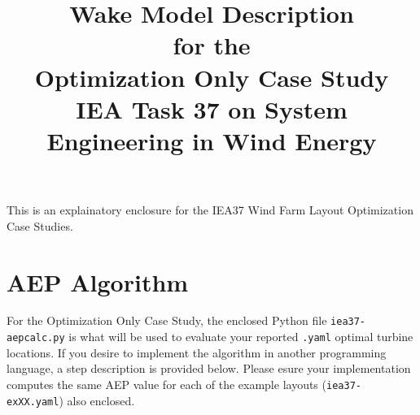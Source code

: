 \documentclass[12pt]{article}
\begin{document}
\title{\vspace{-3cm}Wake Model Description \\ \small{for the} \\ \large{Optimization Only Case Study} \\
    \small{IEA Task 37 on System Engineering in Wind Energy}}
    \date{\vspace{-3cm}}
\maketitle

\noindent This is an explainatory enclosure for the IEA37 Wind Farm Layout Optimization Case Studies.

\section*{AEP Algorithm}

    For the Optimization Only Case Study, the enclosed Python file \texttt{iea37-aepcalc.py} is what will be used to evaluate your reported \texttt{.yaml} optimal turbine locations.
    If you desire to implement the algorithm in another programming language, a step description is provided below. Please esure your implementation computes the same AEP value for each of the example layouts (\texttt{iea37-exXX.yaml}) also enclosed.
    
\end{document}
